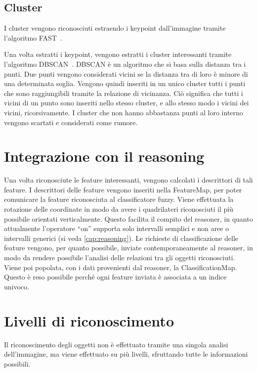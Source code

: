 \subsection{Cluster}

I cluster vengono riconosciuti estraendo i keypoint dall'immagine tramite l'algoritmo FAST~\cite{rosten_2006_machine}.


Una volta estratti i keypoint, vengono estratti i cluster interessanti tramite l'algoritmo DBSCAN~\cite{ester1996density}.
DBSCAN è un algoritmo che si basa sulla distanza tra i punti. Due punti vengono considerati vicini se la distanza tra di loro è minore di una determinata soglia. Vengono quindi inseriti in un unico cluster tutti i punti che sono raggiungibili tramite la relazione di vicinanza. Ciò significa che tutti i vicini di un punto sono inseriti nello stesso cluster, e allo stesso modo i vicini dei vicini, ricorsivamente.
I cluster che non hanno abbastanza punti al loro interno vengono scartati e considerati come rumore.

\section{Integrazione con il reasoning}
Una volta riconosciute le feature interessanti, vengono calcolati i descrittori di tali feature. I descrittori delle feature vengono inseriti nella FeatureMap, per poter comunicare la feature riconosciuta al classificatore fuzzy.
Viene effettuata la rotazione delle coordinate in modo da avere i quadrilateri riconosciuti il più possibile orientati verticalmente. Questo facilita il compito del reasoner, in quanto attualmente l'operatore ``on'' supporta solo intervalli semplici e non aree o intervalli generici (si veda \autoref{cap:reasoning}).
Le richieste di classificazione delle feature vengono, per quanto possibile, inviate contemporaneamente al reasoner, in modo da rendere possibile l'analisi delle relazioni tra gli oggetti riconosciuti. Viene poi popolata, con i dati provenienti dal reasoner, la ClassificationMap. Questo è reso possibile perché ogni feature inviata è associata a un indice univoco.


\section{Livelli di riconoscimento}
Il riconoscimento degli oggetti non è effettuato tramite una singola analisi dell'immagine, ma viene effettuato su più livelli, sfruttando tutte le informazioni possibili. 

